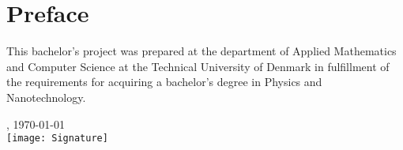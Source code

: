 \chapter{Preface}
This bachelor's project was prepared at the department of Applied Mathematics and Computer Science at the Technical University of Denmark in fulfillment of the requirements for acquiring a bachelor's degree in Physics and Nanotechnology.

\vfill

{
\centering
    \thesislocation{}, \today\\[1cm]
    \hspace{3cm}\texttt{[image: Signature]}\\[1cm]
\begin{flushright}
    \thesisauthor{}
\end{flushright}
}